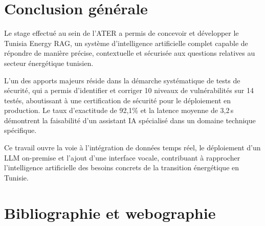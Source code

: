 \documentclass[12pt,a4paper,oneside]{report}
\begin{document}
\chapter*{Conclusion g\'{e}n\'{e}rale}



Le stage effectu\'{e} au sein de l'ATER a permis de concevoir et d\'{e}velopper le Tunisia Energy RAG, un syst\`{e}me d'intelligence artificielle complet capable de r\'{e}pondre de mani\`{e}re pr\'{e}cise, contextuelle et s\'{e}curis\'{e}e aux questions relatives au secteur \'{e}nerg\'{e}tique tunisien.



L'un des apports majeurs r\'{e}side dans la d\'{e}marche syst\'{e}matique de tests de s\'{e}curit\'{e}, qui a permis d'identifier et corriger 10 niveaux de vuln\'{e}rabilit\'{e}s sur 14 test\'{e}s, aboutissant \`{a} une certification de s\'{e}curit\'{e} pour le d\'{e}ploiement en production. Le taux d'exactitude de 92,1\% et la latence moyenne de 3,2\,s d\'{e}montrent la faisabilit\'{e} d'un assistant IA sp\'{e}cialis\'{e} dans un domaine technique sp\'{e}cifique.



Ce travail ouvre la voie \`{a} l'int\'{e}gration de donn\'{e}es temps r\'{e}el, le d\'{e}ploiement d'un LLM on-premise et l'ajout d'une interface vocale, contribuant \`{a} rapprocher l'intelligence artificielle des besoins concrets de la transition \'{e}nerg\'{e}tique en Tunisie.






\chapter*{Bibliographie et webographie}
\end{document}
